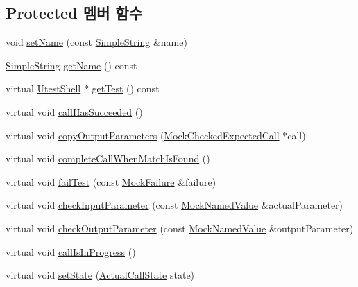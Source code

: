 \subsection*{Protected 멤버 함수}
\begin{DoxyCompactItemize}
\item 
void \hyperlink{class_mock_checked_actual_call_a78091e2f29ee18ffda3ad24165e73f51}{set\+Name} (const \hyperlink{class_simple_string}{Simple\+String} \&name)
\item 
\hyperlink{class_simple_string}{Simple\+String} \hyperlink{class_mock_checked_actual_call_ab9fb89f09ab681191e4eaa9221b42491}{get\+Name} () const 
\item 
virtual \hyperlink{class_utest_shell}{Utest\+Shell} $\ast$ \hyperlink{class_mock_checked_actual_call_aa10112b41f7ed20162b12633042bb775}{get\+Test} () const 
\item 
virtual void \hyperlink{class_mock_checked_actual_call_ae81fb048e3c671dcea98e758ce893af5}{call\+Has\+Succeeded} ()
\item 
virtual void \hyperlink{class_mock_checked_actual_call_a36356ef39dd2664152f94d6843c45365}{copy\+Output\+Parameters} (\hyperlink{class_mock_checked_expected_call}{Mock\+Checked\+Expected\+Call} $\ast$call)
\item 
virtual void \hyperlink{class_mock_checked_actual_call_aae5ca9ab18e1a3a03ab292e825e2ece6}{complete\+Call\+When\+Match\+Is\+Found} ()
\item 
virtual void \hyperlink{class_mock_checked_actual_call_a275e824525aa26cb8874437442cdc186}{fail\+Test} (const \hyperlink{class_mock_failure}{Mock\+Failure} \&failure)
\item 
virtual void \hyperlink{class_mock_checked_actual_call_a43315549d2e79952b76f087c3b9722cf}{check\+Input\+Parameter} (const \hyperlink{class_mock_named_value}{Mock\+Named\+Value} \&actual\+Parameter)
\item 
virtual void \hyperlink{class_mock_checked_actual_call_ae5bb17583112fdf624ab592bf40d39c1}{check\+Output\+Parameter} (const \hyperlink{class_mock_named_value}{Mock\+Named\+Value} \&output\+Parameter)
\item 
virtual void \hyperlink{class_mock_checked_actual_call_a60fd1e06699e3f79444c4e7f8055ac4a}{call\+Is\+In\+Progress} ()
\item 
virtual void \hyperlink{class_mock_checked_actual_call_acbfb5aa021e0d33ea6b83de2738a5424}{set\+State} (\hyperlink{class_mock_checked_actual_call_a51287301ad26cf1a31a1e33a4fd76e8c}{Actual\+Call\+State} state)
\end{DoxyCompactItemize}
